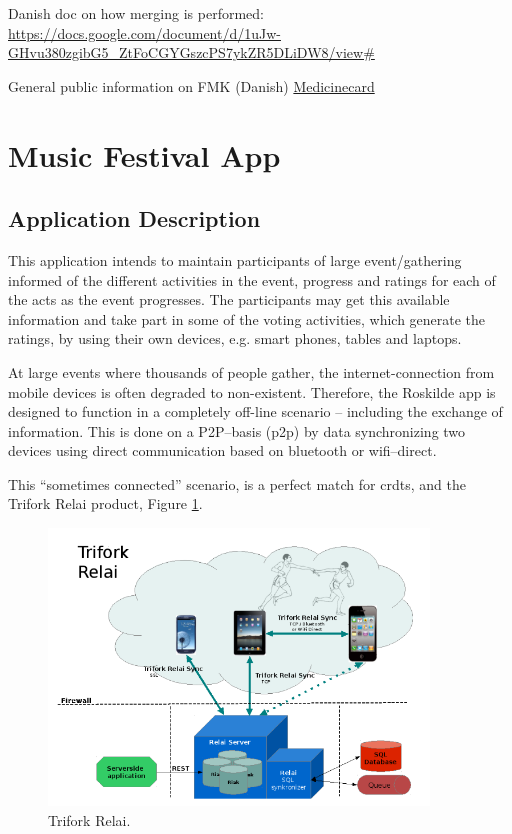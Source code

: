 \documentclass[11pt,a4paper]{report}
\begin{document}
Danish doc on how merging is performed:
\url{https://docs.google.com/document/d/1uJw-GHvu380zgibG5_ZtFoCGYGszcPS7ykZR5DLiDW8/view#}

General public information on FMK (Danish)
\hyperlink{http://digitaliser.dk/group/1597792/profile}{Medicinecard}


\section{Music Festival App}

\subsection{Application Description}
This application intends to maintain participants of large event/gathering informed of the different activities in the event, progress and ratings for each of the acts as the event progresses. The participants may get this available information and take part in some of the voting activities, which generate the ratings, by using their own devices, e.g. smart phones, tables and laptops.

At large events where thousands of people gather, the internet-connection from mobile devices is often degraded to non-existent. Therefore, the Roskilde app is designed to function in a completely off-line scenario -- including the exchange of information. This is done on a P2P--basis (\gls{p2p}) by data synchronizing two devices using  direct communication based on bluetooth or wifi--direct.

This ``sometimes connected'' scenario, is a perfect match for \glspl{crdt}, and the Trifork Relai product, Figure \ref{fig:trifork_relai}.
\begin{figure}[!h]
	\centering
	\includegraphics[width=0.9\textwidth]{./img/image4.png}

	\caption{Trifork Relai.}
	\label{fig:trifork_relai}
\end{figure}
\end{document}
